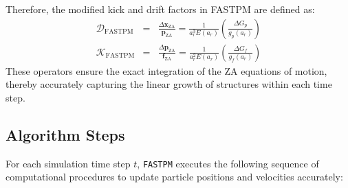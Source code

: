 Therefore, the modified kick and drift factors in FASTPM are defined as:
\begin{eqnarray}
    \mathcal{D}_{\text{FASTPM}} &=& \frac{\Delta \mathbf{x}_{\text{ZA}}}{\mathbf{p}_{\text{ZA}}} 
        = \frac{1}{a_r^3 E(a_r)} \left( \frac{\Delta G_p}{g_p(a_r)} \right) \\[1em]
    \mathcal{K}_{\text{FASTPM}} &=& \frac{\Delta \mathbf{p}_{\text{ZA}}}{\mathbf{f}_{\text{ZA}}} 
        = \frac{1}{a_r^2 E(a_r)} \left( \frac{\Delta G_f}{g_f(a_r)} \right) 
\end{eqnarray}
These operators ensure the exact integration of the ZA equations of motion, thereby accurately capturing the linear growth of structures within each time step.

\subsection{Algorithm Steps}
For each simulation time step $t$, \texttt{FASTPM} executes the following sequence of computational procedures to update particle positions and velocities accurately:


